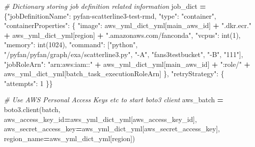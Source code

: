 \documentclass[
]{book}
\newenvironment{Shaded}{\begin{snugshade}}{\end{snugshade}}
\newcommand{\BuiltInTok}[1]{#1}
\newcommand{\CommentTok}[1]{\textcolor[rgb]{0.56,0.35,0.01}{\textit{#1}}}
\newcommand{\DecValTok}[1]{\textcolor[rgb]{0.00,0.00,0.81}{#1}}
\newcommand{\NormalTok}[1]{#1}
\newcommand{\OperatorTok}[1]{\textcolor[rgb]{0.81,0.36,0.00}{\textbf{#1}}}
\newcommand{\StringTok}[1]{\textcolor[rgb]{0.31,0.60,0.02}{#1}}
\begin{document}
\begin{Shaded}
\begin{Highlighting}[]
\CommentTok{\# Dictionary storing job definition related information}
\NormalTok{job\_dict }\OperatorTok{=}\NormalTok{ \{}\StringTok{"jobDefinitionName"}\NormalTok{: }\StringTok{\textquotesingle{}pyfan{-}scatterline3{-}test{-}rmd\textquotesingle{}}\NormalTok{,}
            \StringTok{"type"}\NormalTok{: }\StringTok{"container"}\NormalTok{,}
            \StringTok{"containerProperties"}\NormalTok{: \{}
                \StringTok{"image"}\NormalTok{: aws\_yml\_dict\_yml[}\StringTok{\textquotesingle{}main\_aws\_id\textquotesingle{}}\NormalTok{] }\OperatorTok{+} \StringTok{".dkr.ecr."} \OperatorTok{+}
\NormalTok{                         aws\_yml\_dict\_yml[}\StringTok{\textquotesingle{}region\textquotesingle{}}\NormalTok{] }\OperatorTok{+} \StringTok{".amazonaws.com/fanconda"}\NormalTok{,}
                \StringTok{"vcpus"}\NormalTok{: }\BuiltInTok{int}\NormalTok{(}\DecValTok{1}\NormalTok{),}
                \StringTok{"memory"}\NormalTok{: }\BuiltInTok{int}\NormalTok{(}\DecValTok{1024}\NormalTok{),}
                \StringTok{"command"}\NormalTok{: [}\StringTok{"python"}\NormalTok{,}
                            \StringTok{"/pyfan/pyfan/graph/exa/scatterline3.py"}\NormalTok{,}
                            \StringTok{"{-}A"}\NormalTok{, }\StringTok{"fans3testbucket"}\NormalTok{,}
                            \StringTok{"{-}B"}\NormalTok{, }\StringTok{"111"}\NormalTok{],}
                \StringTok{"jobRoleArn"}\NormalTok{: }\StringTok{"arn:aws:iam::"} \OperatorTok{+}\NormalTok{ aws\_yml\_dict\_yml[}\StringTok{\textquotesingle{}main\_aws\_id\textquotesingle{}}\NormalTok{] }\OperatorTok{+}
                              \StringTok{":role/"} \OperatorTok{+}\NormalTok{ aws\_yml\_dict\_yml[}\StringTok{\textquotesingle{}batch\_task\_executionRoleArn\textquotesingle{}}\NormalTok{]}
\NormalTok{            \},}
            \StringTok{"retryStrategy"}\NormalTok{: \{}
                \StringTok{"attempts"}\NormalTok{: }\DecValTok{1}
\NormalTok{            \}\}}

\CommentTok{\# Use AWS Personal Access Keys etc to start boto3 client}
\NormalTok{aws\_batch }\OperatorTok{=}\NormalTok{ boto3.client(}\StringTok{\textquotesingle{}batch\textquotesingle{}}\NormalTok{,}
\NormalTok{  aws\_access\_key\_id}\OperatorTok{=}\NormalTok{aws\_yml\_dict\_yml[}\StringTok{\textquotesingle{}aws\_access\_key\_id\textquotesingle{}}\NormalTok{],}
\NormalTok{  aws\_secret\_access\_key}\OperatorTok{=}\NormalTok{aws\_yml\_dict\_yml[}\StringTok{\textquotesingle{}aws\_secret\_access\_key\textquotesingle{}}\NormalTok{],}
\NormalTok{  region\_name}\OperatorTok{=}\NormalTok{aws\_yml\_dict\_yml[}\StringTok{\textquotesingle{}region\textquotesingle{}}\NormalTok{])}


\end{Highlighting}
\end{Shaded}
\end{document}
